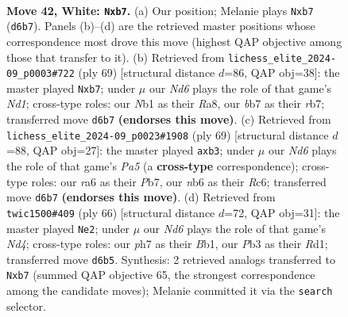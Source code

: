 \documentclass[11pt]{article}
\begin{document}
\clearpage

\begin{figure}[p]\centering
\begin{subfigure}{0.46\textwidth}\centering
\resizebox{\linewidth}{!}{%
\newchessgame
\chessboard[
  setfen={5k2/rb3p1p/rn1N2p1/p3p1P1/P3P3/1P4RP/4K1P1/RN6 w - - 1 42},
  showmover=false,
  pgfstyle=straightmove, color=movearrow, markmove={d6-b7}
]}
\caption{}
\end{subfigure}\hfill
\begin{subfigure}{0.46\textwidth}\centering
\resizebox{\linewidth}{!}{%
\newchessgame
\chessboard[
  setfen={r1rnk3/1R3pp1/1Rp4p/p1Pp1P2/P2P1N2/7P/6P1/5K2 b - - 2 35},
  showmover=false,
  pgfstyle=straightmove, color=movearrow, markmove={d8-b7}
]}
\caption{}
\end{subfigure}
\\[4pt]
\begin{subfigure}{0.46\textwidth}\centering
\resizebox{\linewidth}{!}{%
\newchessgame
\chessboard[
  setfen={4r1k1/1p4p1/2r2p2/1N1RpPp1/p1P1n1P1/1P5P/P7/3R2K1 b - - 0 35},
  showmover=false,
  pgfstyle=straightmove, color=movearrow, markmove={a4-b3}
]}
\caption{}
\end{subfigure}\hfill
\begin{subfigure}{0.46\textwidth}\centering
\resizebox{\linewidth}{!}{%
\newchessgame
\chessboard[
  setfen={2r5/1prb1pk1/p1n3pp/3p4/3N2PP/1P2PP2/P4K2/1B1R3R w - - 3 34},
  showmover=false,
  pgfstyle=straightmove, color=movearrow, markmove={d4-e2}
]}
\caption{}
\end{subfigure}
\caption{\textbf{Move 42, White: \texttt{Nxb7}.} (a) Our position; Melanie plays \texttt{Nxb7} (\texttt{d6b7}). Panels (b)--(d) are the retrieved master positions whose correspondence most drove this move (highest QAP objective among those that transfer to it). (b) Retrieved from \texttt{lichess\_elite\_2024-09\_p0003\#722} (ply 69) [structural distance $d$=86, QAP obj=38]: the master played \texttt{Nxb7}; under $\mu$ our \emph{Nd6} plays the role of that game's \emph{Nd1}; cross-type roles: our \emph{N}b1 as their \emph{R}a8, our \emph{b}b7 as their \emph{r}b7; transferred move \texttt{d6b7} \textbf{(endorses this move)}. (c) Retrieved from \texttt{lichess\_elite\_2024-09\_p0023\#1908} (ply 69) [structural distance $d$=88, QAP obj=27]: the master played \texttt{axb3}; under $\mu$ our \emph{Nd6} plays the role of that game's \emph{Pa5} (a \textbf{cross-type} correspondence); cross-type roles: our \emph{r}a6 as their \emph{P}b7, our \emph{n}b6 as their \emph{R}c6; transferred move \texttt{d6b7} \textbf{(endorses this move)}. (d) Retrieved from \texttt{twic1500\#409} (ply 66) [structural distance $d$=72, QAP obj=31]: the master played \texttt{Ne2}; under $\mu$ our \emph{Nd6} plays the role of that game's \emph{Nd4}; cross-type roles: our \emph{p}h7 as their \emph{B}b1, our \emph{P}b3 as their \emph{R}d1; transferred move \texttt{d6b5}. Synthesis: 2 retrieved analogs transferred to \texttt{Nxb7} (summed QAP objective 65, the strongest correspondence among the candidate moves); Melanie committed it via the \texttt{search} selector.}
\label{fig:thought-m82}
\end{figure}
\end{document}
